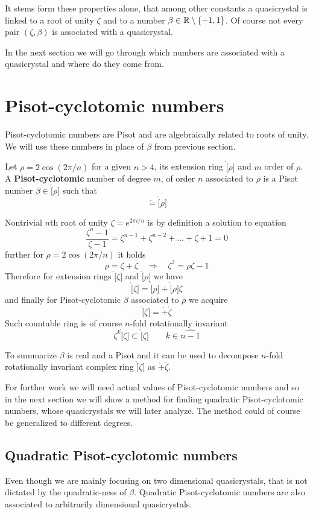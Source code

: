 \documentclass[text.tex]{subfiles}
\begin{document}
It stems form these properties alone, that among other constants a quasicrystal is linked to a root of unity $\zeta$ and to a number $\beta\in\mathbb{R}\setminus\{-1,1\}$. Of course not every pair $(\zeta, \beta)$ is associated with a quasicrystal.

In the next section we will go through which numbers are associated with a quasicrystal and where do they come from. 

\section{Pisot-cyclotomic numbers}\label{sec_pisotCyclotomic}%
Pisot-cyclotomic numbers are Pisot and are algebraically related to roots of unity. We will use these numbers in place of $\beta$ from previous section. 

\begin{definition}\label{def_pisotCyclotomic}
Let $\rho = 2\cos\left(2\pi/n\right)$ for a given $n>4$, its extension ring $\ring[\rho]$ and $m$ order of $\rho$. A \textbf{Pisot-cyclotomic} number of degree $m$, of order $n$ associated to $\rho$ is a Pisot number $\beta \in \ring[\rho]$ such that
$$\ring = \ring[\rho]$$
\end{definition}

Nontrivial $n$th root of unity $\zeta = e^{2\pi i/n}$ is by definition a solution to equation
$$\frac{\zeta^n-1}{\zeta-1} = \zeta^{n-1}+\zeta^{n-2}+\dots+\zeta+1 = 0$$
further for $\rho = 2\cos\left(2\pi/n\right)$ it holds
$$\rho = \zeta + \bar{\zeta}\quad\Rightarrow\quad \zeta^2 = \rho\zeta - 1$$
Therefore for extension rings $\ring[\zeta]$ and $\ring[\rho]$ we have
$$\ring[\zeta] = \ring[\rho] + \ring[\rho]\zeta$$
and finally for Pisot-cyclotomic $\beta$ associated to $\rho$ we acquire
$$\ring[\zeta] = \ring + \ring\zeta$$
Such countable ring is of course $n$-fold rotationally invariant
$$\zeta^k\ring[\zeta] \subset \ring[\zeta]\qquad k\in\widehat{n-1}$$

To summarize $\beta$ is real and a Pisot and it can be used to decompose $n$-fold rotationally invariant complex ring $\ring[\zeta]$ as $\ring + \ring\zeta$. 

For further work we will need actual values of Pisot-cyclotomic numbers and so in the next section we will show a method for finding quadratic Pisot-cyclotomic numbers, whose quasicrystals we will later analyze. The method could of course be generalized to different degrees. 

\subsection{Quadratic Pisot-cyclotomic numbers}
\begin{remark}
Even though we are mainly focusing on two dimensional quasicrystals, that is not dictated by the quadratic-ness of $\beta$. Quadratic Pisot-cyclotomic numbers are also associated to arbitrarily dimensional quasicrystals. 
\end{remark}
\end{document}
